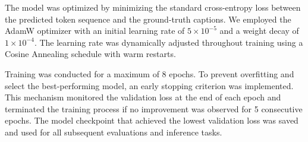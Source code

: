 The model was optimized by minimizing the standard cross-entropy loss between the predicted token sequence and the ground-truth captions. We employed the AdamW optimizer with an initial learning rate of $5 \times 10^{-5}$ and a weight decay of $1 \times 10^{-4}$. The learning rate was dynamically adjusted throughout training using a Cosine Annealing schedule with warm restarts.

Training was conducted for a maximum of 8 epochs. To prevent overfitting and select the best-performing model, an early stopping criterion was implemented. This mechanism monitored the validation loss at the end of each epoch and terminated the training process if no improvement was observed for 5 consecutive epochs. The model checkpoint that achieved the lowest validation loss was saved and used for all subsequent evaluations and inference tasks.

